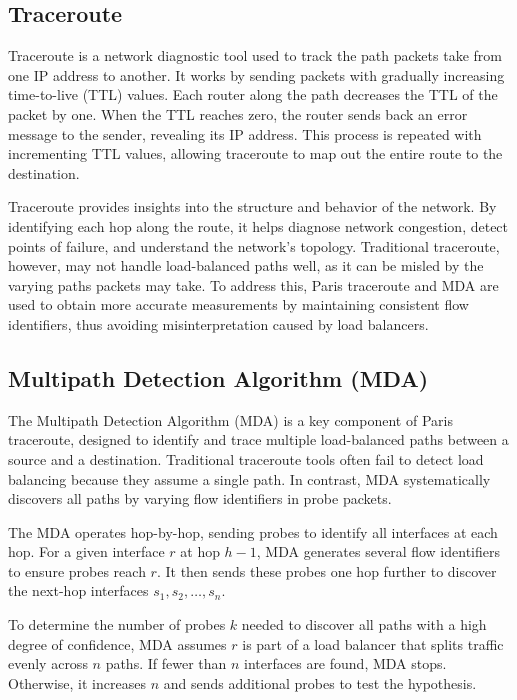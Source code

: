 \documentclass[12pt]{cwru_thesis}
\begin{document}
\subsection{Traceroute}

Traceroute is a network diagnostic tool used to track the path packets take from one IP address to another. It works by sending packets with gradually increasing time-to-live (TTL) values. Each router along the path decreases the TTL of the packet by one. When the TTL reaches zero, the router sends back an error message to the sender, revealing its IP address. This process is repeated with incrementing TTL values, allowing traceroute to map out the entire route to the destination.

Traceroute provides insights into the structure and behavior of the network. By identifying each hop along the route, it helps diagnose network congestion, detect points of failure, and understand the network's topology. Traditional traceroute, however, may not handle load-balanced paths well, as it can be misled by the varying paths packets may take. To address this,  Paris traceroute and MDA are used to obtain more accurate measurements by maintaining consistent flow identifiers, thus avoiding misinterpretation caused by load balancers.

\subsection{Multipath Detection Algorithm (MDA)}

The Multipath Detection Algorithm (MDA) is a key component of Paris traceroute, designed to identify and trace multiple load-balanced paths between a source and a destination. Traditional traceroute tools often fail to detect load balancing because they assume a single path. In contrast, MDA systematically discovers all paths by varying flow identifiers in probe packets.

The MDA operates hop-by-hop, sending probes to identify all interfaces at each hop. For a given interface \(r\) at hop \(h-1\), MDA generates several flow identifiers to ensure probes reach \(r\). It then sends these probes one hop further to discover the next-hop interfaces \(s_1, s_2, \ldots, s_n\).

To determine the number of probes \(k\) needed to discover all paths with a high degree of confidence, MDA assumes \(r\) is part of a load balancer that splits traffic evenly across \(n\) paths. If fewer than \(n\) interfaces are found, MDA stops. Otherwise, it increases \(n\) and sends additional probes to test the hypothesis.
\end{document}
